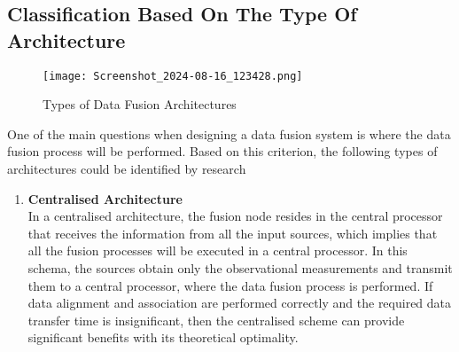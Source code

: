 \subsection{Classification Based On The Type Of Architecture}
\begin{figure}[h!]
    \centering
    \texttt{[image: Screenshot\_2024-08-16\_123428.png]}  %
    \caption{Types of Data Fusion Architectures}
    \label{fig:landscapeimage}
\end{figure}
One of the main questions when designing a data fusion system is where the data fusion process will be performed. Based on this criterion, the following types of architectures could be identified by research
\begin{enumerate}
\item\textbf{Centralised Architecture} \\In a centralised architecture, the fusion node resides in the central processor that receives the information from all the input sources, which implies that all the fusion processes will be executed in a central processor. In this schema, the sources obtain only the observational measurements and transmit them to a central processor, where the data fusion process is performed. If data alignment and association are performed correctly and the required data transfer time is insignificant, then the centralised scheme can provide significant benefits with its theoretical optimality.


\end{enumerate}
